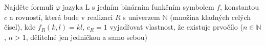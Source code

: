 \subsubsection{}
Najděte formuli $\varphi$ jazyka L s jedním binárním funkčním symbolem $f$,
konstantou $c$ a rovností, která bude v realizaci $R$ s univerzem $\mathbb{N}$
(množina kladných celých čísel), kde $f_{R}(k,l)=kl$, $c_{R}=1$ vyjadřovat
vlastnost, že existuje prvočílo ($n \in \mathbb{N}$, $n > 1$, dělitelné jen
jedničkou a samo sebou)
